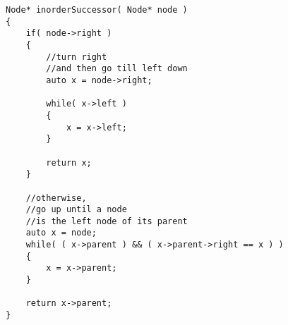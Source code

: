\setcounter{lstlisting}{0}
\begin{lstlisting}[style=customc, caption={Iteration}]
Node* inorderSuccessor( Node* node )
{
    if( node->right )
    {
        //turn right
        //and then go till left down
        auto x = node->right;

        while( x->left )
        {
            x = x->left;
        }

        return x;
    }

    //otherwise,
    //go up until a node
    //is the left node of its parent
    auto x = node;
    while( ( x->parent ) && ( x->parent->right == x ) )
    {
        x = x->parent;
    }

    return x->parent;
}
\end{lstlisting}

